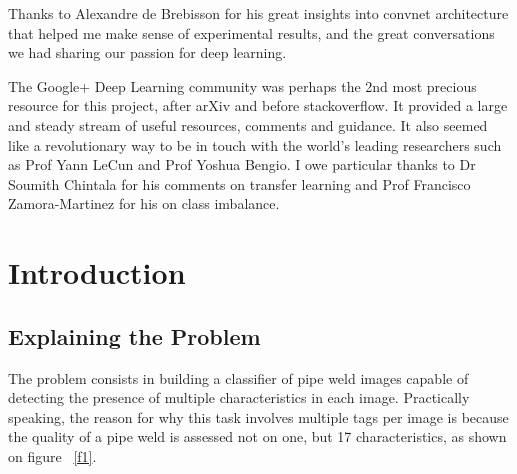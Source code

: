 \documentclass[a4paper,11pt]{article}
\begin{document}
Thanks to Alexandre de Brebisson for his great insights into convnet architecture that helped me make sense of experimental results, and the great conversations we had sharing our passion for deep learning.

The Google+ Deep Learning community was perhaps the 2nd most precious resource for this project, after arXiv and before stackoverflow. It provided a large and steady stream of useful resources, comments and guidance. It also seemed like a revolutionary way to be in touch with the world's leading researchers such as Prof Yann LeCun and Prof Yoshua Bengio. I owe particular thanks to Dr Soumith Chintala for his comments on transfer learning and Prof Francisco Zamora-Martinez for his on class imbalance.

\clearpage
\section{Introduction}

\subsection{Explaining the Problem}

The problem consists in building a classifier of pipe weld images capable of detecting the presence of multiple characteristics in each image. Practically speaking, the reason for why this task involves multiple tags per image is because the quality of a pipe weld is assessed not on one, but 17 characteristics, as shown on figure ~\ref{f1}.
\end{document}
